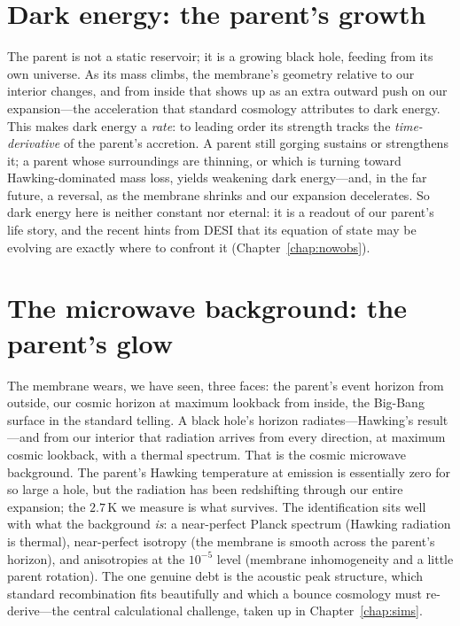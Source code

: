 \section{Dark energy: the parent's growth}
\label{sec:dark-energy}

The parent is not a static reservoir; it is a growing black hole, feeding from its
own universe. As its mass climbs, the membrane's geometry relative to our interior
changes, and from inside that shows up as an extra outward push on our
expansion---the acceleration that standard cosmology attributes to dark energy.
This makes dark energy a \emph{rate}: to leading order its strength tracks the
\emph{time-derivative} of the parent's accretion. A parent still gorging sustains
or strengthens it; a parent whose surroundings are thinning, or which is turning
toward Hawking-dominated mass loss, yields weakening dark energy---and, in the far
future, a reversal, as the membrane shrinks and our expansion decelerates. So
dark energy here is neither constant nor eternal: it is a readout of our parent's
life story, and the recent hints from DESI that its equation of state may be
evolving are exactly where to confront it (Chapter~\ref{chap:nowobs}).

\section{The microwave background: the parent's glow}
\label{sec:cmb}

The membrane wears, we have seen, three faces: the parent's event horizon from
outside, our cosmic horizon at maximum lookback from inside, the Big-Bang surface
in the standard telling. A black hole's horizon radiates---Hawking's
result---and from our interior that radiation arrives from every direction, at
maximum cosmic lookback, with a thermal spectrum. That is the cosmic microwave
background. The parent's Hawking temperature at emission is essentially zero for so
large a hole, but the radiation has been redshifting through our entire expansion;
the $2.7\,\mathrm{K}$ we measure is what survives. The identification sits well
with what the background \emph{is}: a near-perfect Planck spectrum (Hawking
radiation is thermal), near-perfect isotropy (the membrane is smooth across the
parent's horizon), and anisotropies at the $10^{-5}$ level (membrane inhomogeneity
and a little parent rotation). The one genuine debt is the acoustic peak
structure, which standard recombination fits beautifully and which a bounce
cosmology must re-derive---the central calculational challenge, taken up in
Chapter~\ref{chap:sims}.


